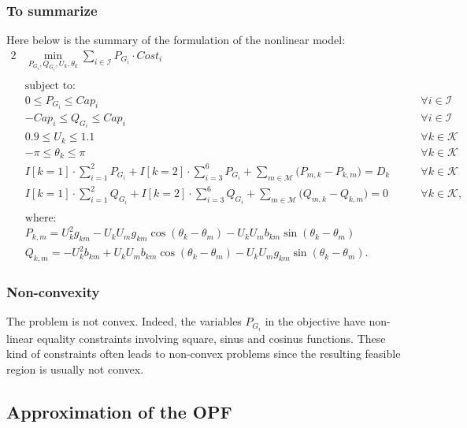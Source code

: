 \subsubsection*{To summarize}
Here below is the summary of the formulation of the nonlinear model: 
\begin{alignat*}{2}
&\min_{P_{G_i}, Q_{G_i}, U_k, \theta_k} \sum_{i \in \mathcal{I}} P_{G_i} \cdot Cost_i\\
&\\
&\text{subject to:}\nonumber \\
&0 \leq P_{G_i} \leq Cap_i  &\qquad \forall i \in \mathcal{I}\\
&-Cap_i \leq Q_{G_i} \leq Cap_i  &\qquad \forall i \in \mathcal{I}\\
&  0.9 \leq U_k \leq 1.1  &\qquad \forall k \in \mathcal{K}\\
&  -\pi \leq \theta_k \leq \pi  &\qquad \forall k \in \mathcal{K}\\
&  I[k = 1] \cdot \sum_{i = 1}^{2} P_{G_i} + I[k = 2] \cdot \sum_{i = 3}^{6} P_{G_i} + \sum_{m \in \mathcal{M}} \big( P_{m,k} - P_{k,m} \big) = D_k &\qquad \forall k \in \mathcal{K} \\
& I[k = 1] \cdot \sum_{i = 1}^{2} Q_{G_i} + I[k = 2] \cdot \sum_{i = 3}^{6} Q_{G_i} + \sum_{m \in \mathcal{M}} \big( Q_{m,k} - Q_{k,m} \big) = 0 &\qquad \forall k \in \mathcal{K},\\
&\\
&\text{where:}\nonumber \\
& P_{k,m} = U^2_{k} g_{km} − U_{k} U_{m} g_{km} \cos(\theta_k − \theta_m) − U_k U_m b_{km} \sin(\theta_k − \theta_m) \\
& Q_{k,m} = −U^2_k b_{km} + U_k U_m b_{km} \cos(\theta_k − \theta_m) − U_k U_m g_{km} \sin(\theta_k − \theta_m).
\end{alignat*} 

\subsubsection*{Non-convexity}
The problem is not convex. Indeed, the variables $P_{G_i}$ in the objective have non-linear equality constraints involving square, sinus and cosinus functions. These kind of constraints often leads to non-convex problems since the resulting feasible region is usually not convex. %

\newpage

\subsection{Approximation of the OPF}
